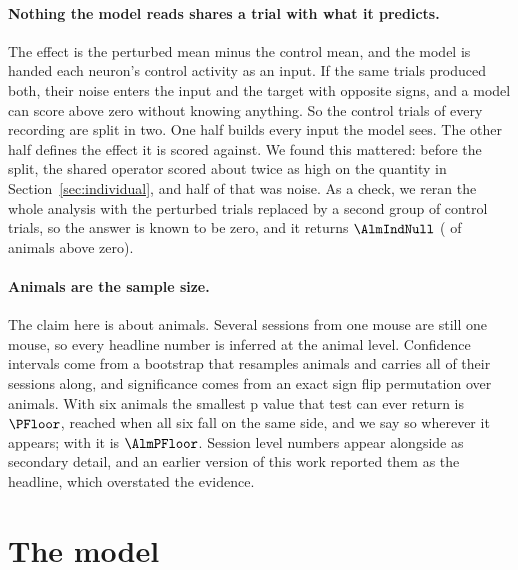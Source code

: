 \documentclass[11pt,letterpaper]{article}
\begin{document}
\paragraph{Nothing the model reads shares a trial with what it predicts.}
The effect is the perturbed mean minus the control mean, and the model is handed each
neuron's control activity as an input. If the same trials produced both, their noise
enters the input and the target with opposite signs, and a model can score above zero
without knowing anything. So the control trials of every recording are split in two.
One half builds every input the model sees. The other half defines the effect it is
scored against. We found this mattered: before the split, the shared operator scored
about twice as high on the quantity in Section~\ref{sec:individual}, and half of that
was noise. As a check, we reran the whole analysis with the perturbed trials replaced
by a second group of control trials, so the answer is known to be zero, and it returns
$\AlmIndNull$ (\AlmIndNullPos{} of \AlmIndNullN{} animals above zero).

\paragraph{Animals are the sample size.}
The claim here is about animals. Several sessions from one mouse are still one mouse, so
every headline number is inferred at the animal level.
Confidence intervals come from a bootstrap that resamples animals and carries all of
their sessions along, and significance comes from an exact sign flip permutation over
animals. With six animals the smallest p value that test can ever
return is $\PFloor$, reached when all six fall on the same side, and we say so
wherever it appears; with \AlmAnimals{} it is $\AlmPFloor$. Session level numbers
appear alongside as secondary detail, and
an earlier version of this work reported them as the headline, which overstated the
evidence.

\section{The model}
\end{document}

